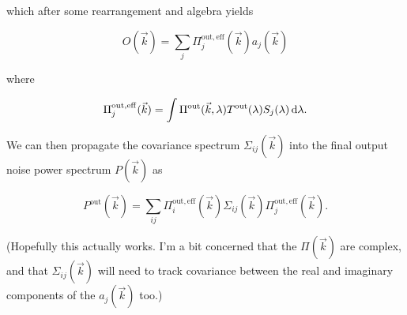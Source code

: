 \documentclass{article}
\begin{document}
which after some rearrangement and algebra yields

\begin{equation}
  O(\vec{k}) = \sum_j \Pi_j^\mathrm{out, eff}(\vec{k}) a_j(\vec{k})
\end{equation}

where

\begin{equation}
  \Pi_j^\mathrm{out, eff}(\vec{k}) = \int \Pi^\mathrm{out}(\vec{k}, \lambda) T^\mathrm{out}(\lambda) S_j(\lambda)\dif{\lambda}.
\end{equation}

We can then propagate the covariance spectrum $\Sigma_{ij}(\vec{k})$ into the final output
noise power spectrum $P(\vec{k})$ as

\begin{equation}
  P^\mathrm{out}(\vec{k}) = \sum_{ij} \Pi_i^\mathrm{out, eff}(\vec{k}) \Sigma_{ij}(\vec{k}) \Pi_j^\mathrm{out, eff}(\vec{k}).
\end{equation}

(Hopefully this actually works.  I'm a bit concerned that the $\Pi(\vec{k})$ are complex, and that
$\Sigma_{ij}(\vec{k})$ will need to track covariance between the real and imaginary components of
the $a_j(\vec{k})$ too.)
\end{document}
